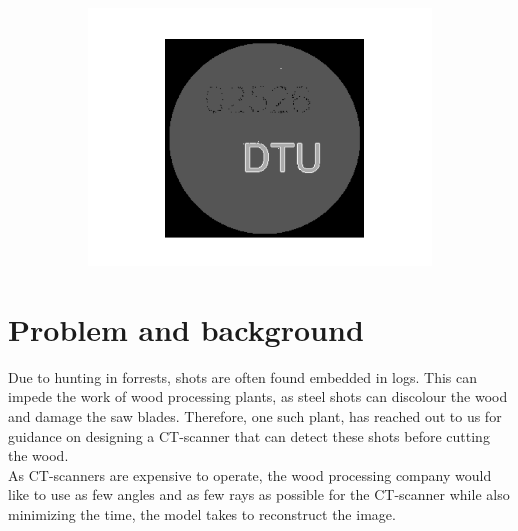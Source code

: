 \documentclass{article}
\begin{document}
\begin{figure}[H]
\begin{subfigure}[t]{0.5\linewidth}
\centering
\includegraphics[width=\linewidth]{code/test_logo_kmeans.png}
\end{subfigure}

\vspace{10pt}

\label{fig:front_page}
\end{figure}

\clearpage
{} 
\newpage


\section{Problem and background} 
Due to hunting in forrests, shots are often found embedded in logs. This can impede the work of wood processing plants, as steel shots can discolour the wood and damage the saw blades. Therefore, one such plant, has reached out to us for guidance on designing a CT-scanner that can detect these shots before cutting the wood. \\
As CT-scanners are expensive to operate, the wood processing company would like to use as few angles and as few rays as possible for the CT-scanner while also minimizing the time, the model takes to reconstruct the image.
\end{document}
